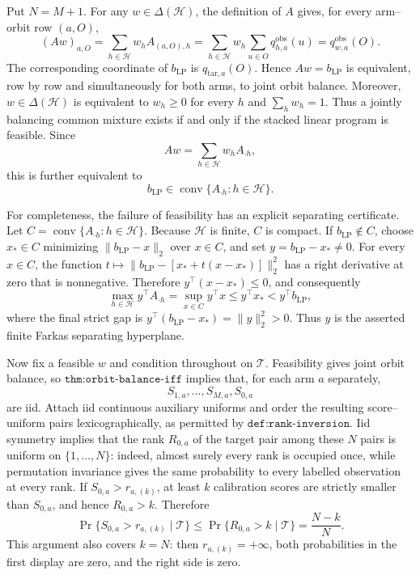 Put \(N=M+1\). For any \(w\in\Delta(\mathcal H)\), the definition of \(A\) gives, for every arm--orbit row \((a,O)\),
\[
(Aw)_{a,O}=\sum_{h\in\mathcal H}w_h A_{(a,O),h}=\sum_{h\in\mathcal H}w_h\sum_{u\in O}q^{\mathrm{obs}}_{h,a}(u)=q^{\mathrm{obs}}_{w,a}(O).
\]
The corresponding coordinate of \(b_{\mathrm{LP}}\) is \(q_{\mathrm{tar},a}(O)\). Hence \(Aw=b_{\mathrm{LP}}\) is equivalent, row by row and simultaneously for both arms, to joint orbit balance. Moreover, \(w\in\Delta(\mathcal H)\) is equivalent to \(w_h\ge 0\) for every \(h\) and \(\sum_h w_h=1\). Thus a jointly balancing common mixture exists if and only if the stacked linear program is feasible. Since
\[
Aw=\sum_{h\in\mathcal H}w_hA_{\cdot h},
\]
this is further equivalent to
\[
b_{\mathrm{LP}}\in\operatorname{conv}\{A_{\cdot h}:h\in\mathcal H\}.
\]

For completeness, the failure of feasibility has an explicit separating certificate. Let \(C=\operatorname{conv}\{A_{\cdot h}:h\in\mathcal H\}\). Because \(\mathcal H\) is finite, \(C\) is compact. If \(b_{\mathrm{LP}}\notin C\), choose \(x_*\in C\) minimizing \(\lVert b_{\mathrm{LP}}-x\rVert_2\) over \(x\in C\), and set \(y=b_{\mathrm{LP}}-x_*\ne0\). For every \(x\in C\), the function \(t\mapsto\lVert b_{\mathrm{LP}}-[x_*+t(x-x_*)]\rVert_2^2\) has a right derivative at zero that is nonnegative. Therefore \(y^\top(x-x_*)\le0\), and consequently
\[
\max_{h\in\mathcal H}y^\top A_{\cdot h}=\sup_{x\in C}y^\top x\le y^\top x_*<y^\top b_{\mathrm{LP}},
\]
where the final strict gap is \(y^\top(b_{\mathrm{LP}}-x_*)=\lVert y\rVert_2^2>0\). Thus \(y\) is the asserted finite Farkas separating hyperplane.

Now fix a feasible \(w\) and condition throughout on \(\mathcal T\). Feasibility gives joint orbit balance, so \(\texttt{thm:orbit-balance-iff}\) implies that, for each arm \(a\) separately,
\[
S_{1,a},\ldots,S_{M,a},S_{0,a}
\]
are iid. Attach iid continuous auxiliary uniforms and order the resulting score--uniform pairs lexicographically, as permitted by \(\texttt{def:rank-inversion}\). Iid symmetry implies that the rank \(R_{0,a}\) of the target pair among these \(N\) pairs is uniform on \(\{1,\ldots,N\}\): indeed, almost surely every rank is occupied once, while permutation invariance gives the same probability to every labelled observation at every rank. If \(S_{0,a}>r_{a,(k)}\), at least \(k\) calibration scores are strictly smaller than \(S_{0,a}\), and hence \(R_{0,a}>k\). Therefore
\[
\Pr\{S_{0,a}>r_{a,(k)}\mid\mathcal T\}
\le \Pr\{R_{0,a}>k\mid\mathcal T\}
=\frac{N-k}{N}.
\]
This argument also covers \(k=N\): then \(r_{a,(k)}=+\infty\), both probabilities in the first display are zero, and the right side is zero.

